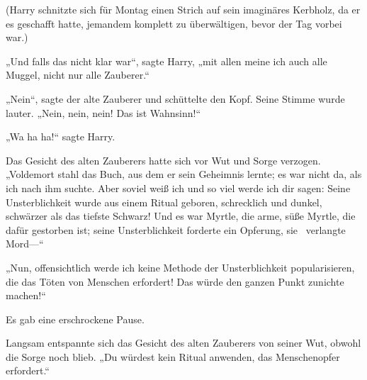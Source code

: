 (Harry schnitzte sich für Montag einen Strich auf sein imaginäres Kerbholz, da er es geschafft hatte, jemandem komplett zu überwältigen, bevor der Tag vorbei war.)

„Und falls das nicht klar war“, sagte Harry, „mit allen meine ich auch alle Muggel, nicht nur alle Zauberer.“

„Nein“, sagte der alte Zauberer und schüttelte den Kopf. Seine Stimme wurde lauter. „Nein, nein, nein! Das ist Wahnsinn!“

„Wa ha ha!“ sagte Harry.

Das Gesicht des alten Zauberers hatte sich vor Wut und Sorge verzogen. „Voldemort stahl das Buch, aus dem er sein Geheimnis lernte; es war nicht da, als ich nach ihm suchte. Aber soviel weiß ich und so viel werde ich dir sagen: Seine Unsterblichkeit wurde aus einem Ritual geboren, schrecklich und dunkel, schwärzer als das tiefste Schwarz! Und es war Myrtle, die arme, süße Myrtle, die dafür gestorben ist; seine Unsterblichkeit forderte ein Opferung, sie ~verlangte Mord—“

„Nun, offensichtlich werde ich keine Methode der Unsterblichkeit popularisieren, die das Töten von Menschen erfordert! Das würde den ganzen Punkt zunichte machen!“

Es gab eine erschrockene Pause.

Langsam entspannte sich das Gesicht des alten Zauberers von seiner Wut, obwohl die Sorge noch blieb. „Du würdest kein Ritual anwenden, das Menschenopfer erfordert.“

